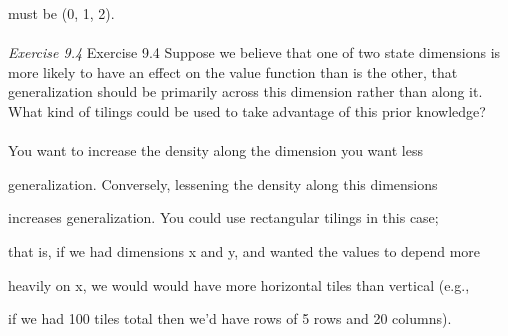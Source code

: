 \documentclass{article}
\begin{document}
must be (0, 1, 2).
\\\\
\textit{Exercise 9.4} Exercise 9.4 Suppose we believe that one of two state dimensions is more likely to have an effect on the value function than is the other, that generalization should be primarily across this dimension rather than along it. What kind of tilings could be used to take
advantage of this prior knowledge?
\\
\\

You want to increase the density along the dimension you want less

generalization. Conversely, lessening the density along this dimensions 

increases generalization. You could use rectangular tilings in this case; 

that is, if we had dimensions x and y, and wanted the values to depend more 

heavily on x, we would would have more horizontal tiles than vertical (e.g., 

if we had 100 tiles total then we'd have rows of 5 rows and 20 columns).
\end{document}
